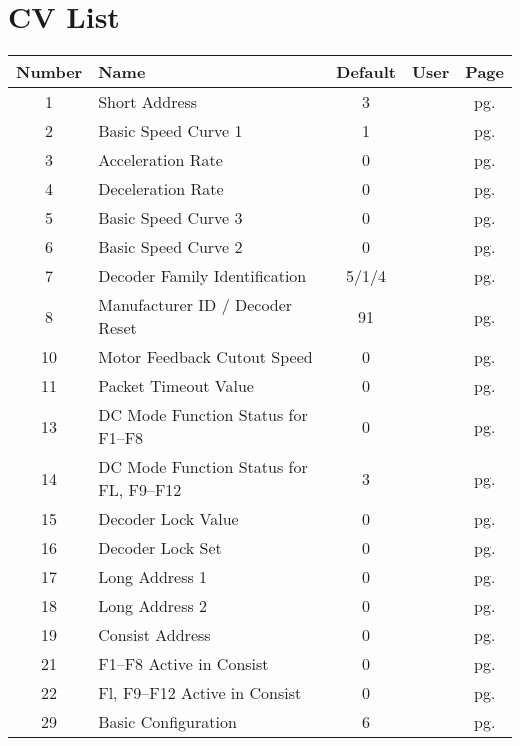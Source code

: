 \documentclass[12pt,letterpaper,draft]{memoir} %
\begin{document}
\appendix
\chapter{CV List}

\begin{center}
\begin{longtable}{|c|l|c|c|c|}
\hline
Number&Name&Default&User&Page \\ \hline\hline
1&Short Address&3&&pg. \pageref{CV1} \\ \hline
2&Basic Speed Curve 1&1&&pg. \pageref{CV2} \\ \hline
3&Acceleration Rate&0&&pg. \pageref{CV3} \\ \hline
4&Deceleration Rate&0&&pg. \pageref{CV4} \\ \hline
5&Basic Speed Curve 3&0&&pg. \pageref{CV5} \\ \hline
6&Basic Speed Curve 2&0&&pg. \pageref{CV6} \\ \hline
7&Decoder Family Identification&5/1/4&&pg. \pageref{CV7} \\ \hline
8&Manufacturer ID / Decoder Reset&91&&pg. \pageref{CV8} \\ \hline
10&Motor Feedback Cutout Speed&0&&pg. \pageref{CV10} \\ \hline
11&Packet Timeout Value&0&&pg. \pageref{CV11} \\ \hline
13&DC Mode Function Status for F1--F8&0&&pg. \pageref{CV13} \\ \hline
14&DC Mode Function Status for FL, F9--F12&3&&pg. \pageref{CV14} \\ \hline
15&Decoder Lock Value&0&&pg. \pageref{CV15} \\ \hline
16&Decoder Lock Set&0&&pg. \pageref{CV16} \\ \hline
17&Long Address 1&0&&pg. \pageref{CV17} \\ \hline
18&Long Address 2&0&&pg. \pageref{CV18} \\ \hline
19&Consist Address&0&&pg. \pageref{CV19} \\ \hline
21&F1--F8 Active in Consist&0&&pg. \pageref{CV21} \\ \hline
22&Fl, F9--F12 Active in Consist&0&&pg. \pageref{CV22} \\ \hline
29&Basic Configuration&6&&pg. \pageref{CV29} \\ \hline

\end{longtable}
\end{center}
\end{document}

